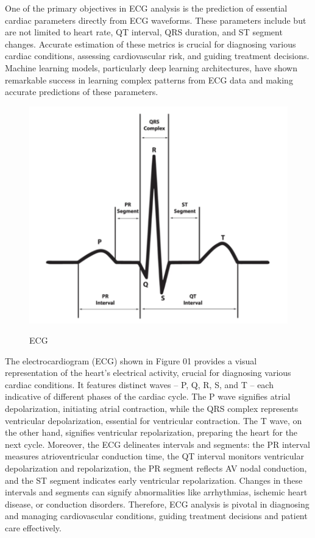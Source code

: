 \documentclass[conference]{IEEEtran}
\begin{document}
One of the primary objectives in ECG analysis is the prediction of essential cardiac parameters directly from ECG waveforms. These parameters include but are not limited to heart rate, QT interval, QRS duration, and ST segment changes. Accurate estimation of these metrics is crucial for diagnosing various cardiac conditions, assessing cardiovascular risk, and guiding treatment decisions. Machine learning models, particularly deep learning architectures, have shown remarkable success in learning complex patterns from ECG data and making accurate predictions of these parameters.

\begin{figure}[htbp]
\centering
{\includegraphics[scale=0.3]{fig1.png}}
\caption{ ECG \cite{b9}}
\label{fig}
\end{figure}

The electrocardiogram (ECG) shown in Figure 01 provides a visual representation of the heart's electrical activity, crucial for diagnosing various cardiac conditions. It features distinct waves – P, Q, R, S, and T – each indicative of different phases of the cardiac cycle. The P wave signifies atrial depolarization, initiating atrial contraction, while the QRS complex represents ventricular depolarization, essential for ventricular contraction. The T wave, on the other hand, signifies ventricular repolarization, preparing the heart for the next cycle. Moreover, the ECG delineates intervals and segments: the PR interval measures atrioventricular conduction time, the QT interval monitors ventricular depolarization and repolarization, the PR segment reflects AV nodal conduction, and the ST segment indicates early ventricular repolarization. Changes in these intervals and segments can signify abnormalities like arrhythmias, ischemic heart disease, or conduction disorders. Therefore, ECG analysis is pivotal in diagnosing and managing cardiovascular conditions, guiding treatment decisions and patient care effectively.
\end{document}
